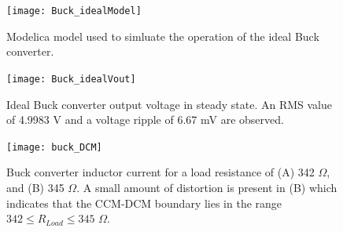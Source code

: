 \documentclass[12pt,twoside]{scrartcl}
\begin{document}
\begin{figure}[h]
    \centering
    \texttt{[image: Buck\_idealModel]}
    \caption{Modelica model used to simluate the operation of the ideal Buck converter.}
    \label{fig:Buck_idealModel}
\end{figure}

\begin{figure}[h]
    \centering
    \texttt{[image: Buck\_idealVout]}
    \caption{Ideal Buck converter output voltage in steady state. An RMS value of 4.9983 V and a voltage ripple of 6.67 mV are observed.}
    \label{fig:Buck_idealVout}
\end{figure}

\begin{figure}[h!]
    \centering
    \texttt{[image: buck\_DCM]}
    \caption{Buck converter inductor current for a load resistance of (A) 342 $\Omega$, and (B) 345 $\Omega$. A small amount of distortion is present in (B) which indicates that the CCM-DCM boundary lies in the range $342 \le R_{Load} \le 345$ $\Omega$.}
    \label{fig:buck_DCM}
\end{figure}
\newpage
\end{document}
